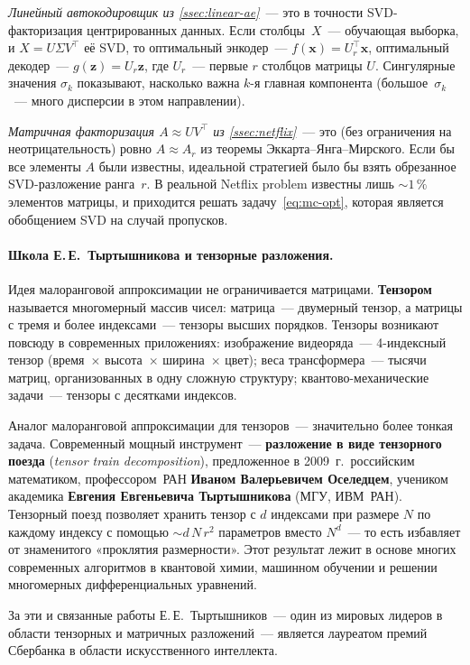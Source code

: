 \emph{Линейный автокодировщик из \cref{ssec:linear-ae}}~--- это в
точности SVD-факторизация центрированных данных. Если столбцы~$X$~---
обучающая выборка, и $X=U\Sigma V^{\top}$ её SVD, то оптимальный
энкодер~--- $f(\mathbf x)=U_r^{\top}\mathbf x$, оптимальный
декодер~--- $g(\mathbf z)=U_r\mathbf z$, где $U_r$~--- первые $r$ столбцов
матрицы $U$. Сингулярные значения $\sigma_k$ показывают, насколько
важна $k$-я главная компонента (большое~$\sigma_k$~--- много дисперсии
в этом направлении).

\emph{Матричная факторизация $A\approx UV^{\top}$ из
\cref{ssec:netflix}}~--- это (без ограничения на неотрицательность)
ровно $A\approx A_r$ из теоремы Эккарта--Янга--Мирского. Если бы все
элементы $A$ были известны, идеальной стратегией было бы взять
обрезанное SVD-разложение ранга~$r$. В реальной Netflix problem
известны лишь $\sim 1\,\%$ элементов матрицы, и приходится решать
задачу~\eqref{eq:mc-opt}, которая является обобщением SVD на случай
пропусков.

\paragraph{Школа Е.\,Е.~Тыртышникова и тензорные разложения.}
Идея малоранговой аппроксимации не ограничивается матрицами.
\textbf{Тензором} называется многомерный массив чисел: матрица~---
двумерный тензор, а матрицы с тремя и более индексами~--- тензоры
высших порядков. Тензоры возникают повсюду в современных приложениях:
изображение видеоряда~--- 4-индексный тензор (время~$\times$ высота~$\times$ ширина~$\times$ цвет);
веса трансформера~--- тысячи матриц, организованных в одну сложную
структуру; квантово-механические задачи~--- тензоры с десятками
индексов.

Аналог малоранговой аппроксимации для тензоров~--- значительно более
тонкая задача. Современный мощный инструмент~---
\textbf{разложение в виде тензорного поезда} (\emph{tensor train
decomposition}), предложенное в 2009~г.\ российским математиком,
профессором~РАН \textbf{Иваном Валерьевичем Оселедцем}, учеником
академика \textbf{Евгения Евгеньевича Тыртышникова} (МГУ, ИВМ~РАН).
Тензорный поезд позволяет хранить тензор с $d$ индексами при размере
$N$ по каждому индексу с помощью $\sim d\,N\,r^{2}$ параметров вместо
$N^{d}$~--- то есть избавляет от знаменитого «проклятия размерности».
Этот результат лежит в основе многих современных алгоритмов в
квантовой химии, машинном обучении и решении многомерных
дифференциальных уравнений.

За эти и связанные работы Е.\,Е.~Тыртышников~--- один из мировых
лидеров в области тензорных и матричных разложений~--- является
лауреатом премий Сбербанка в области искусственного интеллекта.

